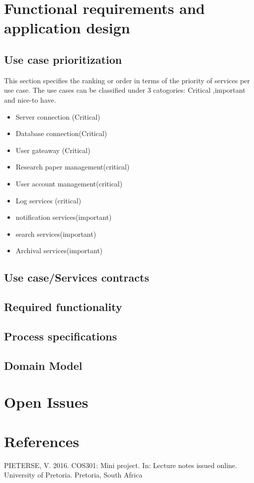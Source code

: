 \documentclass[a4paper,12pt]{report}
\begin{document}
\section{Functional requirements and application design}

\subsection{Use case prioritization}
This section specifies the ranking or order in terms of the priority of services per use case. The use cases can be classified under 3 catogories: Critical ,important and nice-to have.
	\begin{itemize}
		\item Server connection (Critical)
		\item Database connection(Critical)
		\item User gateaway (Critical)
		\item Research paper management(critical)
		\item User account management(critical)
		\item Log services (critical)
		\item notification services(important)
		\item search services(important)
		\item Archival services(important)
	\end{itemize} 

\subsection{Use case/Services contracts}

\subsection{Required functionality}

\subsection{Process specifications}

\subsection{Domain Model}


\section{Open Issues}

\newpage
\section{References}
PIETERSE, V. 2016. COS301: Mini project. In: Lecture notes issued online.  University of Pretoria. Pretoria, South Africa
\end{document}
